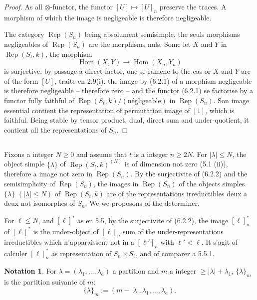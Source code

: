 \documentclass[11pt,a4paper]{article}
\theoremstyle{plain}
\theoremstyle{definition}
\newtheorem{notation}[theorem]{Notation}
\DeclareMathOperator{\Hom}{Hom}
\DeclareMathOperator{\Rep}{Rep}
\begin{document}
\begin{proof}
As all $\otimes$-functor, the functor $[U] \mapsto [U]_n$ preserve the traces. A morphism of which the image is negligeable is therefore negligeable.

The category $\Rep(S_n)$ being absolument semisimple, the seuls morphisms negligeables of $\Rep(S_n)$ are the morphisms nuls. Some let $X$ and $Y$ in $\Rep(S_t, k)$, the morphism
\begin{equation}
\Hom(X, Y) \to \Hom(X_n, Y_n) \tag{6.2.2}
\end{equation}
is surjective: by passage a direct factor, one se ramene to the cas or $X$ and $Y$ are of the form $[U]$, traite en 2.9(i). the image by (6.2.1) of a morphism negligeable is therefore negligeable -- therefore zero -- and the functor (6.2.1) se factorise by a functor fully faithful of $\Rep(S_t, k)/(\text{n\'egligeable})$ in $\Rep(S_n)$. Son image essential contient the representation of permutation image of $[1]$, which is faithful. Being stable by tensor product, dual, direct sum and under-quotient, it contient all the representations of $S_n$.
\end{proof}

\subsection{}
Fixons a integer $N \geq 0$ and assume that $t$ is a integer $n \geq 2N$. For $|\lambda| \leq N$, the object simple $\{\lambda\}$ of $\Rep(S_t, k)^{(N)}$ is of dimension not zero (5.1 (ii)), therefore a image not zero in $\Rep(S_n)$. By the surjectivite of (6.2.2) and the semisimplicity of $\Rep(S_n)$, the images in $\Rep(S_n)$ of the objects simples $\{\lambda\}$ $(|\lambda| \leq N)$ of $\Rep(S_t, k)$ are of the representations irreductibles deux a deux not isomorphes of $S_n$. We we proposons of the determiner.

For $\ell \leq N$, and $[\ell]^*$ as en 5.5, by the surjectivite of (6.2.2), the image $[\ell]^*_n$ of $[\ell]^*$ is the under-object of $[\ell]_n$ sum of the under-representations irreductibles which n'apparaissent not in a $[\ell']_n$ with $\ell' < \ell$. It s'agit of calculer $[\ell]^*_n$ as representation of $S_n \times S_\ell$, and of comparer a 5.5.1.

\begin{notation}
For $\lambda = (\lambda_1, \ldots, \lambda_a)$ a partition and $m$ a integer $\geq |\lambda| + \lambda_1$, $\{\lambda\}_m$ is the partition suivante of $m$:
\begin{equation}
\{\lambda\}_m := (m - |\lambda|, \lambda_1, \ldots, \lambda_a). \tag{6.3.1}
\end{equation}
\end{notation}
\end{document}
